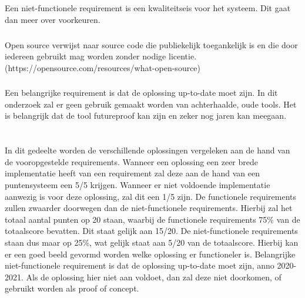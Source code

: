 \subsection{}
\label{subsec:Niet-functionele Requirements}
Een niet-functionele requirement is een kwaliteitseis voor het systeem. Dit gaat dan meer over voorkeuren.

\subsubsection{}
\label{subsubsec:Open source}
Open source verwijst naar source code die publiekelijk toegankelijk is en die door iedereen gebruikt mag worden zonder nodige licentie. (https://opensource.com/resources/what-open-source)

\subsubsection{}
\label{subsubsecAnno 2020-2021}
Een belangrijke requirement is dat de oplossing up-to-date moet zijn. In dit onderzoek zal er geen gebruik gemaakt worden van achterhaalde, oude tools. Het is belangrijk dat de tool futureproof kan zijn en zeker nog jaren kan meegaan.




\section{}
\label{sec:Hoe beantwoorden de verschillende oplossingen aan de bovenstaande requirements}

In dit gedeelte worden de verschillende oplossingen vergeleken aan de hand van de vooropgestelde requirements. Wanneer een oplossing een zeer brede implementatie heeft van een requirement zal deze aan de hand van een puntensysteem een 5/5 krijgen. Wanneer er niet voldoende implementatie aanwezig is voor deze oplossing, zal dit een 1/5 zijn. De functionele requirements zullen zwaarder doorwegen dan de niet-functionele requirements. Hierbij zal het totaal aantal punten op 20 staan, waarbij de functionele requirements 75\% van de totaalscore bevatten. Dit staat gelijk aan 15/20. De niet-functionele requirements staan dus maar op 25\%, wat gelijk staat aan 5/20 van de totaalscore. Hierbij kan er een goed beeld gevormd worden welke oplossing er functioneler is. Belangrijke niet-functionele requirement is dat de oplossing up-to-date moet zijn, anno 2020-2021. Als de oplossing hier niet aan voldoet, dan zal deze niet doorkomen, of gebruikt worden als proof of concept.

